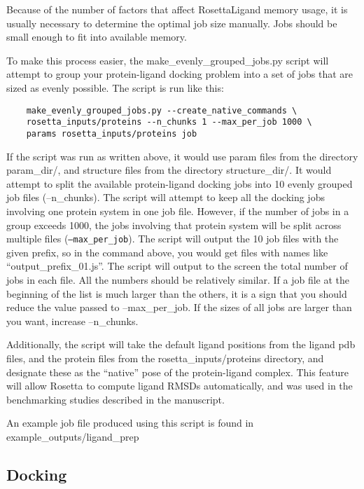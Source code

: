 \begin{enumerate}
	Because of the number of factors that affect RosettaLigand memory usage, it is usually necessary to determine the optimal job size manually.
	Jobs should be small enough to fit into available memory.

	To make this process easier, the make\_evenly\_grouped\_jobs.py script will attempt to group your protein-ligand docking problem into a set of jobs that are sized as evenly possible.
	The script is run like this:

	\begin{verbatim}
	make_evenly_grouped_jobs.py --create_native_commands \
	rosetta_inputs/proteins --n_chunks 1 --max_per_job 1000 \
	params rosetta_inputs/proteins job
	\end{verbatim}

	If the script was run as written above, it would use param files from the directory param\_dir/, and structure files from the directory structure\_dir/.
	It would attempt to split the available protein-ligand docking jobs into 10 evenly grouped job files (--n\_chunks).
	The script will attempt to keep all the docking jobs involving one protein system in one job file.
	However, if the number of jobs in a group exceeds 1000, the jobs involving that protein system will be split across multiple files (\texttt{--max\_per\_job}). The script will output the 10 job files with the given prefix, so in the command above, you would get files with names like ``output\_prefix\_01.js''.
	The script will output to the screen the total number of jobs in each file. 
	All the numbers should be relatively similar.
	If a job file at the beginning of the list is much larger than the others, it is a sign that you should reduce the value passed to --max\_per\_job. If the sizes of all jobs are larger than you want, increase --n\_chunks.

	Additionally, the script will take the default ligand positions from the ligand pdb files, and the protein files from the rosetta\_inputs/proteins directory, and designate these as the ``native'' pose of the protein-ligand complex.
	This feature will allow Rosetta to compute ligand RMSDs automatically, and was used in the benchmarking studies described in the manuscript.

	An example job file produced using this script is found in example\_outputs/ligand\_prep
\end{enumerate}

\subsection{Docking}

